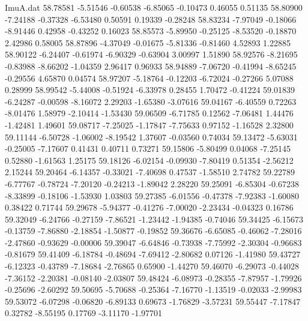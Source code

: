 \begin{filecontents}{ImuA.dat}
  58.78581   -5.51546   -0.60538   -6.85065   -0.10473    0.46055    0.51135
  58.80900   -7.24188   -0.37328   -6.53480    0.50591    0.19339   -0.28248
  58.83234   -7.97049   -0.18066   -8.91446    0.42958   -0.43252    0.16023
  58.85573   -5.89950   -0.25125   -8.53520   -0.18870    2.42986    0.58005
  58.87896   -4.37049   -0.01675   -5.81336   -0.81460    4.52893    1.22885
  58.90122   -6.24407   -0.61974   -6.90329   -0.63904    3.00997    1.51890
  58.92576   -8.21695   -0.83988   -8.66202   -1.04359    2.96417    0.96933
  58.94889   -7.06720   -0.41994   -8.65245   -0.29556    4.65870    0.04574
  58.97207   -5.18764   -0.12203   -6.72024   -0.27266    5.07088    0.28999
  58.99542   -5.44008   -0.51924   -6.33978    0.28455    1.70472   -0.41224
  59.01839   -6.24287   -0.00598   -8.16072    2.29203   -1.65380   -3.07616
  59.04167   -6.40559    0.72263   -8.01476    1.58979   -2.10414   -1.53430
  59.06509   -6.71785    0.12562   -7.06481    1.44476   -1.42481    1.49601
  59.08717   -7.25025   -1.17847   -7.75633    0.97152   -1.16528    2.32800
  59.11144   -6.50728   -1.06002   -8.19542    1.37607   -0.03560    0.74034
  59.13472   -5.63031   -0.25005   -7.17607    0.41431    0.40711    0.73271
  59.15806   -5.80499    0.04068   -7.25145    0.52880   -1.61563    1.25175
  59.18126   -6.02154   -0.09930   -7.80419    0.51354   -2.56212    2.15244
  59.20464   -6.14357   -0.33021   -7.40698    0.47537   -1.58510    2.74782
  59.22789   -6.77767   -0.78724   -7.20120   -0.24213   -1.89042    2.28220
  59.25091   -6.85304   -0.67238   -8.33899   -0.18106   -1.53930    1.03803
  59.27385   -6.01556   -0.47378   -7.92383   -1.60080    0.38422    0.71744
  59.29678   -5.94377   -0.41276   -7.00020   -2.23434   -0.04323    0.16786
  59.32049   -6.24766   -0.27159   -7.86521   -1.23442   -1.94385   -0.74046
  59.34425   -6.15673   -0.13759   -7.86880   -2.18854   -1.50877   -0.19852
  59.36676   -6.65085   -0.46062   -7.28016   -2.47860   -0.93629   -0.00006
  59.39047   -6.64846   -0.73938   -7.75992   -2.30304   -0.96683   -0.81679
  59.41409   -6.18784   -0.48694   -7.69412   -2.80682    0.07126   -1.41980
  59.43727   -6.12323   -0.43789   -7.18684   -2.76865    0.65900   -1.44270
  59.46070   -6.29073   -0.44028   -7.36152   -2.20381   -0.08140   -2.03807
  59.48424   -6.08973   -0.28355   -7.87957   -1.79926   -0.25696   -2.60292
  59.50695   -5.70688   -0.25364   -7.16770   -1.13519   -0.02033   -2.99983
  59.53072   -6.07298   -0.06820   -6.89133    0.69673   -1.76829   -3.57231
  59.55447   -7.17847    0.32782   -8.55195    0.17769   -3.11170   -1.97701

\end{filecontents}
